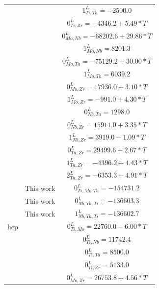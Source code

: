 \begin{longtable}[H]{ c c c }
                  & \cite{Ansara1998} & $1^\textit{L}_{Ti,Ta} = -2500.0$\\
                  & \cite{Kumar1994a} & $0^\textit{L}_{Ti,Zr} = -4346.2+5.49*T$\\
                  & \cite{Xiong2004} & $0^\textit{L}_{Mo,Nb} = -68202.6+29.86*T$\\
                  & \cite{Xiong2004} & $1^\textit{L}_{Mo,Nb} = 8201.3$\\
                  & \cite{Xiong2004} & $0^\textit{L}_{Mo,Ta} = -75129.2+30.00*T$\\
                  & \cite{Xiong2004} & $1^\textit{L}_{Mo,Ta} = 6039.2$\\
                  & \cite{Perez2003} & $0^\textit{L}_{Mo,Zr} = 17936.0+3.10*T$\\
                  & \cite{Perez2003} & $1^\textit{L}_{Mo,Zr} = -991.0+4.30*T$\\
                  & \cite{Xiong2004} & $0^\textit{L}_{Nb,Ta} = 1298.0$\\
                  & \cite{Guillermet1991} & $0^\textit{L}_{Nb,Zr} = 15911.0+3.35*T$\\
                  & \cite{Guillermet1991} & $1^\textit{L}_{Nb,Zr} = 3919.0-1.09*T$\\
                  & \cite{Guillermet1995} & $0^\textit{L}_{Ta,Zr} = 29499.6+2.67*T$\\
                  & \cite{Guillermet1995} & $1^\textit{L}_{Ta,Zr} = -4396.2+4.43*T$\\
                  & \cite{Guillermet1995} & $2^\textit{L}_{Ta,Zr} = -6353.3+4.91*T$\\
                  & This work & $0^\textit{L}_{Ti,Mo,Ta} = -154731.2$\\
                  & This work & $0^\textit{L}_{Nb,Ta,Ti} = -136603.3$\\
                  & This work & $1^\textit{L}_{Nb,Ta,Ti} = -136602.7$\\
          hcp & \cite{Ansara1998} & $0^\textit{L}_{Ti,Mo} = 22760.0-6.00*T$\\      
                  & \cite{Zhang2001} & $0^\textit{L}_{Ti,Nb} = 11742.4$\\
                  & \cite{Ansara1998} & $0^\textit{L}_{Ti,Ta} = 8500.0$\\
                  & \cite{Kumar1994a} & $0^\textit{L}_{Ti,Zr} = 5133.0$\\
                  & \cite{Perez2003} & $0^\textit{L}_{Mo,Zr} = 26753.8+4.56*T$\\

\end{longtable}
